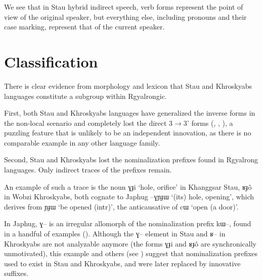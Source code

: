 \documentclass[oneside,a4paper,11pt]{article}
\newcommand{\ipa}[1]{{\phon #1}} %
\begin{document}
We see that in Stau hybrid indirect speech, verb forms represent the point of view of the original speaker, but everything else, including pronouns and their case marking, represent that of the current speaker.


	

	
%



%	
%	
%	
	
\section{Classification} \label{sec:classification}
 There is clear evidence from morphology and lexicon that Stau and Khroskyabs languages constitute a subgroup within Rgyalrongic.
 
 First, both Stau and Khroskyabs languages have generalized the inverse forms in the non-local scenario and completely lost the direct 3$\rightarrow$3' forms (\citealt{lai13affixale}, \citealt{jacques14inverse},   \citealt{lai14person}), a puzzling feature that is unlikely to be an independent innovation, as there is no comparable example in any other language family.
 
 Second, Stau and Khroskyabs lost the nominalization prefixes found in Rgyalrong languages. Only indirect traces of the prefixes remain.
 
 An example of such a trace is the noun \ipa{ɣɟi}  `hole, orifice' in Khanggsar Stau,  \ipa{ʁɟô} in Wobzi Khroskyabs, both   cognate to Japhug \ipa{--ɣɲɟɯ}  `(its) hole, opening', which  derives from \ipa{ɲɟɯ} `be opened (intr)', the anticausative of \ipa{cɯ} `open (a door)'. 
 
 In Japhug, \ipa{ɣ--} is an irregular allomorph of the nominalization prefix \ipa{kɯ--}, found in a handful of examples (\citealt[4-6]{jacques14antipassive}). Although the \ipa{ɣ--} element in Stau and \ipa{ʁ--} in Khroskyabs are not analyzable anymore (the forms \ipa{ɣɟi}  and   \ipa{ʁɟô} are synchronically unmotivated), this example and others (see \citealt[1228-9]{jacques12incorp}) suggest  that nominalization prefixes used to exist in Stau and Khroskyabs, and were later replaced by innovative suffixes.  
 
\end{document}
